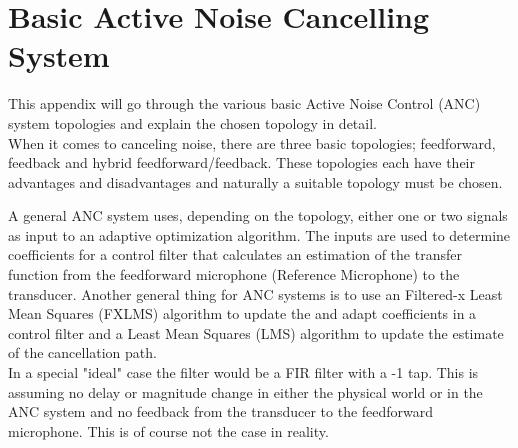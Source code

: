 \section{Basic Active Noise Cancelling System} \label{sec:BasicSystem}
This appendix will go through the various basic Active Noise Control (ANC) system topologies and explain the chosen topology in detail. \\
When it comes to canceling noise, there are three basic topologies; feedforward, feedback and hybrid feedforward/feedback. These topologies each have their advantages and disadvantages and naturally a suitable topology must be chosen.

A general ANC system uses, depending on the topology, either one or two signals as input to an adaptive optimization algorithm. The inputs are used to determine coefficients for a control filter that calculates an estimation of the transfer function from the feedforward microphone (Reference Microphone) to the transducer. Another general thing for ANC systems is to use an Filtered-x Least Mean Squares (FXLMS) algorithm to update the and adapt coefficients in a control filter and a Least Mean Squares (LMS) algorithm to update the estimate of the cancellation path.\\
In a special "ideal" case the filter would be a FIR filter with a -1 tap. This is assuming no delay or magnitude change in either the physical world or in the ANC system and no feedback from the transducer to the feedforward microphone. This is of course not the case in reality. 


